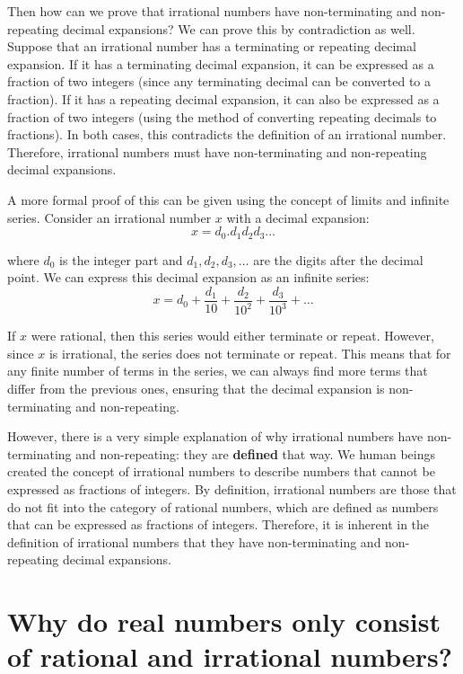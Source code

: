 \documentclass[12pt, letterpaper, oneside]{article}
\begin{document}
Then how can we prove that irrational numbers have non-terminating and non-repeating decimal expansions? We can prove
this by contradiction as well. Suppose that an irrational number has a terminating or repeating decimal expansion. If
it has a terminating decimal expansion, it can be expressed as a fraction of two integers (since any terminating decimal
can be converted to a fraction). If it has a repeating decimal expansion, it can also be expressed as a fraction of two
integers (using the method of converting repeating decimals to fractions). In both cases, this contradicts the
definition of an irrational number. Therefore, irrational numbers must have non-terminating and non-repeating decimal
expansions.

A more formal proof of this can be given using the concept of limits and infinite series. Consider an irrational number
\(x\) with a decimal expansion:
\[x = d_0.d_1d_2d_3\ldots\]

where \(d_0\) is the integer part and \(d_1, d_2, d_3, \ldots\) are the digits after the decimal point. We can express
this decimal expansion as an infinite series:
\[x = d_0 + \frac{d_1}{10} + \frac{d_2}{10^2} + \frac{d_3}{10^3} + \ldots\]

If \(x\) were rational, then this series would either terminate or repeat. However, since \(x\) is irrational, the
series does not terminate or repeat. This means that for any finite number of terms in the series, we can always find
more terms that differ from the previous ones, ensuring that the decimal expansion is non-terminating and non-repeating.

However, there is a very simple explanation of why irrational numbers have non-terminating and non-repeating: they are
\textbf{defined} that way. We human beings created the concept of irrational numbers to describe numbers that cannot be
expressed as fractions of integers. By definition, irrational numbers are those that do not fit into the category of
rational numbers, which are defined as numbers that can be expressed as fractions of integers. Therefore, it is inherent
in the definition of irrational numbers that they have non-terminating and non-repeating decimal expansions.

\section{Why do real numbers only consist of rational and irrational numbers?}
\end{document}
